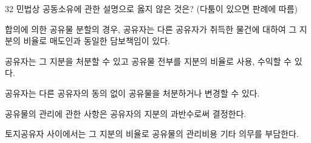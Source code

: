\begin{question}{32}
민법상 공동소유에 관한 설명으로 옳지 않은 것은? (다툼이 있으면 판례에 따름)
\begin{choices}
  \item 합의에 의한 공유물 분할의 경우, 공유자는 다른 공유자가 취득한 물건에 대하여 그 지분의 비율로 매도인과 동일한 담보책임이 있다.
  \item 공유자는 그 지분을 처분할 수 있고 공유물 전부를 지분의 비율로 사용, 수익할 수 있다.
  \item 공유자는 다른 공유자의 동의 없이 공유물을 처분하거나 변경할 수 있다.
  \item 공유물의 관리에 관한 사항은 공유자의 지분의 과반수로써 결정한다.
  \item 토지공유자 사이에서는 그 지분의 비율로 공유물의 관리비용 기타 의무를 부담한다.
\end{choices}
\end{question}
